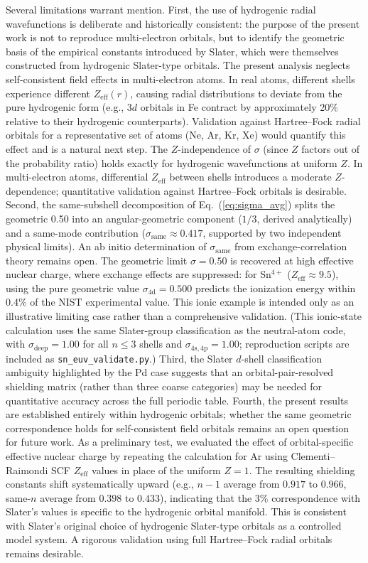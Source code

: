 \documentclass[11pt,a4paper]{article}
\begin{document}
Several limitations warrant mention. First, the use of hydrogenic radial wavefunctions is deliberate and historically consistent: the purpose of the present work is not to reproduce multi-electron orbitals, but to identify the geometric basis of the empirical constants introduced by Slater, which were themselves constructed from hydrogenic Slater-type orbitals. The present analysis neglects self-consistent field effects in multi-electron atoms. In real atoms, different shells experience different $Z_{\mathrm{eff}}(r)$, causing radial distributions to deviate from the pure hydrogenic form (e.g., $3d$ orbitals in Fe contract by approximately 20\% relative to their hydrogenic counterparts). Validation against Hartree--Fock radial orbitals for a representative set of atoms (Ne, Ar, Kr, Xe) would quantify this effect and is a natural next step. The $Z$-independence of $\sigma$ (since $Z$ factors out of the probability ratio) holds exactly for hydrogenic wavefunctions at uniform $Z$. In multi-electron atoms, differential $Z_{\mathrm{eff}}$ between shells introduces a moderate $Z$-dependence; quantitative validation against Hartree--Fock orbitals is desirable. Second, the same-subshell decomposition of Eq.~(\ref{eq:sigma_avg}) splits the geometric 0.50 into an angular-geometric component ($1/3$, derived analytically) and a same-mode contribution ($\sigma_{\mathrm{same}} \approx 0.417$, supported by two independent physical limits). An ab initio determination of $\sigma_{\mathrm{same}}$ from exchange-correlation theory remains open. The geometric limit $\sigma=0.50$ is recovered at high effective nuclear charge, where exchange effects are suppressed: for Sn$^{4+}$ ($Z_{\mathrm{eff}}\approx 9.5$), using the pure geometric value $\sigma_{\mathrm{4d}}=0.500$ predicts the ionization energy within 0.4\% of the NIST experimental value. This ionic example is intended only as an illustrative limiting case rather than a comprehensive validation. (This ionic-state calculation uses the same Slater-group classification as the neutral-atom code, with $\sigma_{\mathrm{deep}}=1.00$ for all $n\le 3$ shells and $\sigma_{\mathrm{4s,4p}}=1.00$; reproduction scripts are included as \texttt{sn\_euv\_validate.py}.) Third, the Slater $d$-shell classification ambiguity highlighted by the Pd case suggests that an orbital-pair-resolved shielding matrix (rather than three coarse categories) may be needed for quantitative accuracy across the full periodic table. Fourth, the present results are established entirely within hydrogenic orbitals; whether the same geometric correspondence holds for self-consistent field orbitals remains an open question for future work. As a preliminary test, we evaluated the effect of orbital-specific effective nuclear charge by repeating the calculation for Ar using Clementi--Raimondi SCF $Z_{\mathrm{eff}}$ values in place of the uniform $Z=1$. The resulting shielding constants shift systematically upward (e.g., $n-1$ average from $0.917$ to $0.966$, same-$n$ average from $0.398$ to $0.433$), indicating that the 3\% correspondence with Slater's values is specific to the hydrogenic orbital manifold. This is consistent with Slater's original choice of hydrogenic Slater-type orbitals as a controlled model system. A rigorous validation using full Hartree--Fock radial orbitals remains desirable.
\end{document}
